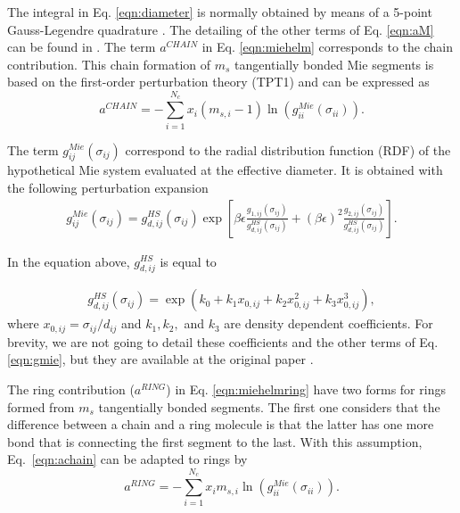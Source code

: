 	
	The integral in Eq. \eqref{eqn:diameter} is normally obtained by means of a 5-point Gauss-Legendre quadrature \cite{papa2014}. The detailing of the other terms of Eq. \eqref{eqn:aM} can be found in . The term $a^{CHAIN}$ in Eq. \ref{eqn:miehelm} corresponds to the chain contribution. This chain formation of $m_{s}$ tangentially bonded Mie segments is based on the first-order perturbation theory (TPT1)  \cite{papa2014} and can be expressed as
	\begin{equation}
	a^{CHAIN} =-\sum_{i=1}^{N_{c}} x_{i}(m_{s,i} - 1)\ln \left(g_{ii}^{Mie}(\sigma_{ii}) \right) .
	\label{eqn:achain}
	\end{equation}
		
	The term $g_{ij}^{Mie}(\sigma_{ij})$ correspond to the radial distribution function (RDF) of the hypothetical Mie system evaluated at the effective diameter. It is obtained with the following perturbation expansion
	\begin{equation}
	\begin{aligned}
	g_{ij}^{Mie}(\sigma_{ij}) =g_{d,ij}^{HS}(\sigma_{ij})\exp \left [\beta\epsilon \frac{g_{1,ij}(\sigma_{ij})}{g_{d,ij}^{HS}(\sigma_{ij})} + (\beta\epsilon)^{2} \frac{g_{2,ij}(\sigma_{ij})}{g_{d,ij}^{HS}(\sigma_{ij})} \right] .
	\end{aligned}
	\label{eqn:gmie}
	\end{equation}
	
	
	In the equation above, $g_{d,ij}^{HS}$ is equal to 
	
	\begin{equation}
	\begin{aligned}
	g_{d,ij}^{HS}(\sigma_{ij}) = \exp (k_{0} + k_{1} x_{0,ij} + k_{2} x_{0,ij}^{2} + k_{3} x_{0,ij}^{3}) ,
	\end{aligned}
	\label{eqn:ghs}
	\end{equation}
	where $x_{0,ij} = \sigma_{ij}/d_{ij}$ and $k_{1}, k_{2},$ and $k_{3}$ are density dependent coefficients. For brevity, we are not going to detail these coefficients and the other terms of Eq. \ref{eqn:gmie}, but they are available at the original paper \cite{lafitte2013}.  
	
	The ring contribution ($a^{RING}$) in Eq. \ref{eqn:miehelmring} have two forms for rings formed from $m_{s}$ tangentially bonded segments. The first one  \cite{lafitte2012} considers that the difference between a chain and a ring molecule is that the latter has one more bond that is connecting the first segment to the last. With this assumption, Eq.~\eqref{eqn:achain} can be adapted to rings by
	\begin{equation}
	a^{RING} =-\sum_{i=1}^{N_{c}} x_{i}m_{s,i}\ln(g_{ii}^{Mie}(\sigma_{ii})) .
	\label{eqn:aringlafitte}
	\end{equation}
	
